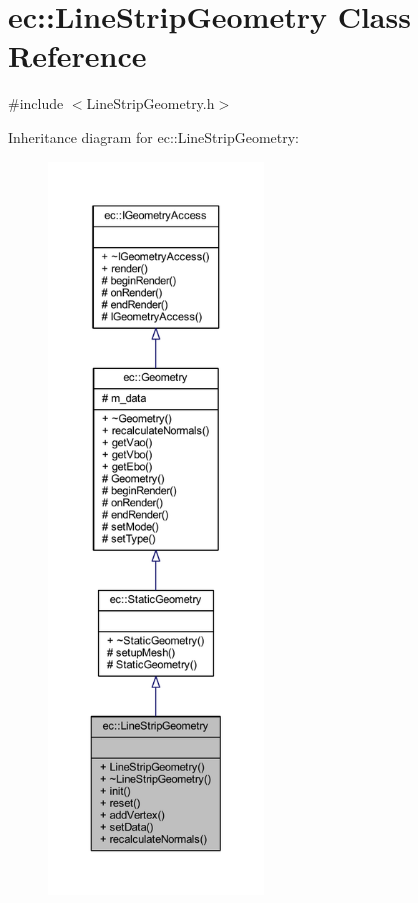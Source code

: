\hypertarget{classec_1_1_line_strip_geometry}{}\section{ec\+:\+:Line\+Strip\+Geometry Class Reference}
\label{classec_1_1_line_strip_geometry}


{\ttfamily \#include $<$Line\+Strip\+Geometry.\+h$>$}



Inheritance diagram for ec\+:\+:Line\+Strip\+Geometry\+:\nopagebreak
\begin{figure}[H]
\begin{center}
\leavevmode
\includegraphics[height=550pt]{classec_1_1_line_strip_geometry__inherit__graph}
\end{center}
\end{figure}


